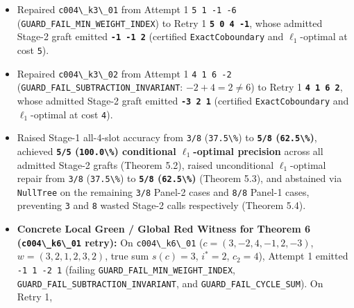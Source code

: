 \documentclass[
  11pt,
]{article}
\newcommand{\passthrough}[1]{#1}
\providecommand{\tightlist}{%
  \setlength{\itemsep}{0pt}\setlength{\parskip}{0pt}}
\begin{document}
\begin{enumerate}
  \begin{itemize}
  \tightlist
  \item
    Repaired \passthrough{\lstinline!c004\_k3\_01!} from Attempt 1
    \passthrough{\lstinline!5 1 -1 -6!}
    (\nolinkurl{GUARD_FAIL_MIN_WEIGHT_INDEX}) to Retry 1
    \textbf{\passthrough{\lstinline!5 0 4 -1!}}, whose admitted Stage-2
    graft emitted \textbf{\passthrough{\lstinline!-1 -1 2!}} (certified
    \nolinkurl{ExactCoboundary} and \(\ell_1\)-optimal at cost
    \passthrough{\lstinline!5!}).
  \item
    Repaired \passthrough{\lstinline!c004\_k3\_02!} from Attempt 1
    \passthrough{\lstinline!4 1 6 -2!}
    (\nolinkurl{GUARD_FAIL_SUBTRACTION_INVARIANT}: \(-2 + 4 = 2 \ne 6\))
    to Retry 1 \textbf{\passthrough{\lstinline!4 1 6 2!}}, whose
    admitted Stage-2 graft emitted
    \textbf{\passthrough{\lstinline!-3 2 1!}} (certified
    \nolinkurl{ExactCoboundary} and \(\ell_1\)-optimal at cost
    \passthrough{\lstinline!4!}).
  \item
    Raised Stage-1 all-4-slot accuracy from
    \passthrough{\lstinline!3/8!} (\passthrough{\lstinline!37.5\%!}) to
    \textbf{\passthrough{\lstinline!5/8!}
    (\passthrough{\lstinline!62.5\%!})}, achieved
    \textbf{\passthrough{\lstinline!5/5!}
    (\passthrough{\lstinline!100.0\%!}) conditional \(\ell_1\)-optimal
    precision} across all admitted Stage-2 grafts (Theorem 5.2), raised
    unconditional \(\ell_1\)-optimal repair from
    \passthrough{\lstinline!3/8!} (\passthrough{\lstinline!37.5\%!}) to
    \textbf{\passthrough{\lstinline!5/8!}
    (\passthrough{\lstinline!62.5\%!})} (Theorem 5.3), and abstained via
    \passthrough{\lstinline!NullTree!} on the remaining
    \passthrough{\lstinline!3/8!} Panel-2 cases and
    \passthrough{\lstinline!8/8!} Panel-1 cases, preventing
    \passthrough{\lstinline!3!} and \passthrough{\lstinline!8!} wasted
    Stage-2 calls respectively (Theorem 5.4).
  \item
    \textbf{Concrete Local Green / Global Red Witness for Theorem 6
    (\passthrough{\lstinline!c004\_k6\_01!} retry):} On
    \passthrough{\lstinline!c004\_k6\_01!}
    (\(c = (3,\allowbreak  -2,\allowbreak  4,\allowbreak  -1,\allowbreak  2,\allowbreak  -3)\),
    \(w = (3,\allowbreak  2,\allowbreak  1,\allowbreak  2,\allowbreak  3,\allowbreak  2)\),
    true sum \(s(c) = 3\), \(i^* = 2\), \(c_2 = 4\)), Attempt 1 emitted
    \passthrough{\lstinline!-1 1 -2 1!} (failing
    \nolinkurl{GUARD_FAIL_MIN_WEIGHT_INDEX},
    \nolinkurl{GUARD_FAIL_SUBTRACTION_INVARIANT}, and
    \nolinkurl{GUARD_FAIL_CYCLE_SUM}). On Retry 1,

\end{itemize}
\end{enumerate}
\end{document}

